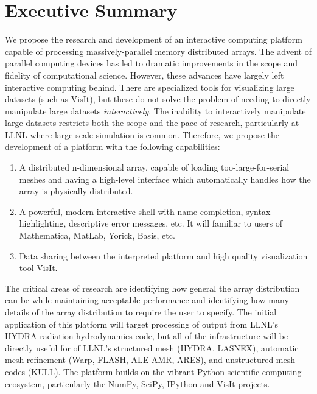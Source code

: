 \documentclass[letterpaper,11pt]{article}
\begin{document}


\setlength{\parindent}{15pt}

\section*{Executive Summary }
We propose the research and development of an interactive computing platform capable of 
processing massively-parallel memory distributed arrays.  The advent of parallel 
computing devices has led to dramatic improvements in the scope and fidelity of 
computational science.  However, these advances have largely left interactive computing 
behind.  There are specialized tools for visualizing large datasets (such as 
VisIt\cite{VisIt}), but these do not solve the problem of needing to directly manipulate 
large datasets \emph{interactively}.  The inability to interactively manipulate large 
datasets restricts both the scope and the pace of research, particularly at LLNL where 
large scale simulation is common.  Therefore, we propose the development of a platform 
with the following capabilities:

\begin{enumerate}
	\item A distributed n-dimensional array, capable of loading too-large-for-serial meshes 
          and having a high-level interface which automatically handles how 
          the array is physically distributed.

	\item A powerful, modern interactive shell with name completion, syntax highlighting, 
		descriptive error messages, etc.  It will familiar to users of Mathematica, 
		MatLab, Yorick, Basis, etc.

	\item Data sharing between the interpreted platform and high quality visualization tool VisIt.
\end{enumerate}

The critical areas of research are identifying how general the array distribution can be 
while maintaining acceptable performance and identifying how many details of the array 
distribution to require the user to specify.  The initial application of this platform 
will target processing of output from LLNL's HYDRA\cite{Marinak2001} radiation-hydrodynamics 
code, but all of the infrastructure will be directly useful for of LLNL's structured mesh 
(HYDRA, LASNEX\cite{Zimmerman1977}), automatic mesh refinement
(Warp\cite{Grote2005}, FLASH\cite{flash}, ALE-AMR\cite{Koniges2010}, ARES\cite{needed}),
and unstructured mesh codes (KULL\cite{Rathkopf2000}).  The platform builds on the vibrant
Python scientific computing ecosystem, particularly the NumPy\cite{Oliphant2006}, 
SciPy\cite{numpyscipy}, IPython\cite{ipython} and VisIt projects.
\end{document}
